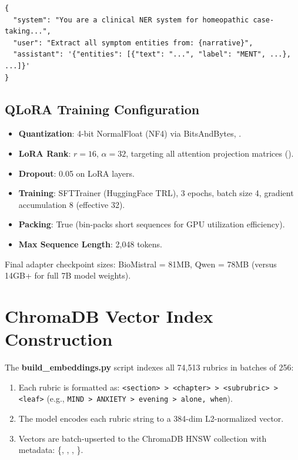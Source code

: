 \begin{lstlisting}[style=python, caption={LLM Training Instance Format}]
{
  "system": "You are a clinical NER system for homeopathic case-taking...",
  "user": "Extract all symptom entities from: {narrative}",
  "assistant": '{"entities": [{"text": "...", "label": "MENT", ...}, ...]}'
}
\end{lstlisting}

\subsection{QLoRA Training Configuration}

\begin{itemize}
  \item \textbf{Quantization}: 4-bit NormalFloat (NF4) via BitsAndBytes, .
  \item \textbf{LoRA Rank}: $r = 16$, $\alpha = 32$, targeting all attention projection matrices ().
  \item \textbf{Dropout}: 0.05 on LoRA layers.
  \item \textbf{Training}: SFTTrainer (HuggingFace TRL), 3 epochs, batch size 4, gradient accumulation 8 (effective 32).
  \item \textbf{Packing}: True (bin-packs short sequences for GPU utilization efficiency).
  \item \textbf{Max Sequence Length}: 2,048 tokens.
\end{itemize}

Final adapter checkpoint sizes: BioMistral = 81MB, Qwen = 78MB (versus 14GB+ for full 7B model weights).


\section{ChromaDB Vector Index Construction}

The \textbf{build\_embeddings.py} script indexes all 74,513 rubrics in batches of 256:

\begin{enumerate}
  \item Each rubric is formatted as: \texttt{<section> > <chapter> > <subrubric> > <leaf>} (e.g., \texttt{MIND > ANXIETY > evening > alone, when}).
  \item The  model encodes each rubric string to a 384-dim L2-normalized vector.
  \item Vectors are batch-upserted to the ChromaDB HNSW collection with metadata: \{, , , \}.
\end{enumerate}

